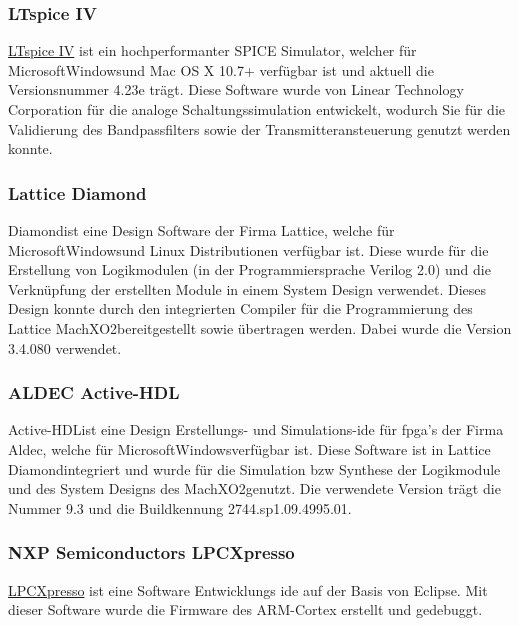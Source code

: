 \subsubsection*{LTspice IV}\label{sw:ltspice}
\href{LTspice IV}{LTspice IV\SymbReg} ist ein hochperformanter SPICE Simulator, welcher für Microsoft\SymbC Windows\SymbReg und Mac OS X 10.7+ verfügbar ist und aktuell die Versionsnummer 4.23e trägt. Diese Software wurde von Linear Technology Corporation für die analoge Schaltungssimulation entwickelt, wodurch Sie für die Validierung des Bandpassfilters sowie der Transmitteransteuerung genutzt werden konnte. \cite{ltspice}

\subsubsection*{Lattice Diamond}\label{subsub:diamond}
Diamond\SymbReg  ist eine Design Software der Firma Lattice\SymbC, welche für Microsoft\SymbC Windows\SymbReg und Linux Distributionen verfügbar ist. Diese wurde für die Erstellung von Logikmodulen (in der Programmiersprache Verilog 2.0) und die Verknüpfung der erstellten Module in einem System Design verwendet. Dieses Design konnte durch den integrierten Compiler für die Programmierung des Lattice MachXO2\SymbTM bereitgestellt sowie übertragen werden. Dabei wurde die Version 3.4.080 verwendet.
\subsubsection*{ALDEC Active-HDL}
Active-HDL\SymbTM ist eine Design Erstellungs- und Simulations-\ac{ide} für \ac{fpga}'s der Firma Aldec, welche für Microsoft\SymbC Windows\SymbReg verfügbar ist. Diese Software ist in Lattice Diamond\SymbReg integriert und wurde für die Simulation \ac{bzw} Synthese der Logikmodule und des System Designs des MachXO2\SymbTM genutzt. Die verwendete Version trägt die Nummer 9.3 und die Buildkennung 2744.sp1.09.4995.01.
\subsubsection*{NXP Semiconductors LPCXpresso}\label{sec:xpresso}
\href{http://www.lpcware.com/lpcxpresso/home}{LPCXpresso} ist eine Software Entwicklungs \ac{ide} auf der Basis von Eclipse. Mit dieser Software wurde die Firmware des ARM-Cortex erstellt und gedebuggt. \cite{lpcxpresso}
